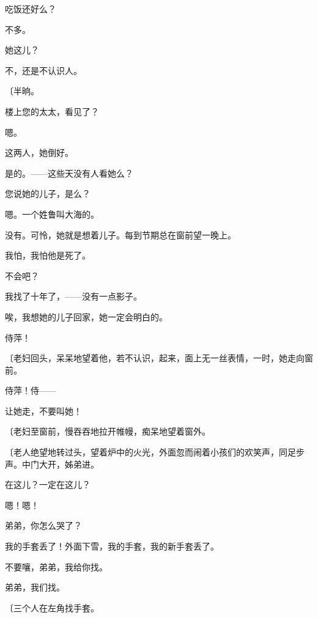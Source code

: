 吃饭还好么？

不多。

她这儿？

不，还是不认识人。

{\fangsong〔半晌。}

楼上您的太太，看见了？

嗯。

这两人，她倒好。

是的。——这些天没有人看她么？

您说她的儿子，是么？

嗯。一个姓鲁叫大海的。

没有。可怜，她就是想着儿子。每到节期总在窗前望一晚上。

我怕，我怕他是死了。

不会吧？

我找了十年了，——没有一点影子。

唉，我想她的儿子回家，她一定会明白的。

侍萍！

{\fangsong〔老妇回头，呆呆地望着他，若不认识，起来，面上无一丝表情，一时，她走向窗前。}

侍萍！侍——

让她走，不要叫她！

{\fangsong〔老妇至窗前，慢吞吞地拉开帷幔，痴呆地望着窗外。}

{\fangsong〔老人绝望地转过头，望着炉中的火光，外面忽而闹着小孩们的欢笑声，同足步声。中门大开，姊弟进。}

在这儿？一定在这儿？

嗯！嗯！

弟弟，你怎么哭了？

我的手套丢了！外面下雪，我的手套，我的新手套丢了。

不要嚷，弟弟，我给你找。

弟弟，我们找。

{\fangsong〔三个人在左角找手套。}

